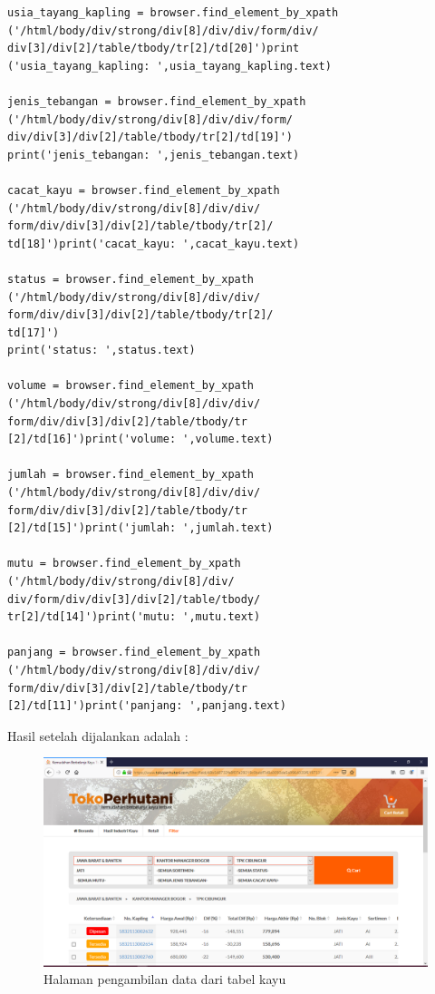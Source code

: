 \begin{verbatim}
usia_tayang_kapling = browser.find_element_by_xpath
('/html/body/div/strong/div[8]/div/div/form/div/
div[3]/div[2]/table/tbody/tr[2]/td[20]')print
('usia_tayang_kapling: ',usia_tayang_kapling.text)

jenis_tebangan = browser.find_element_by_xpath
('/html/body/div/strong/div[8]/div/div/form/
div/div[3]/div[2]/table/tbody/tr[2]/td[19]')
print('jenis_tebangan: ',jenis_tebangan.text)

cacat_kayu = browser.find_element_by_xpath
('/html/body/div/strong/div[8]/div/div/
form/div/div[3]/div[2]/table/tbody/tr[2]/
td[18]')print('cacat_kayu: ',cacat_kayu.text)

status = browser.find_element_by_xpath
('/html/body/div/strong/div[8]/div/div/
form/div/div[3]/div[2]/table/tbody/tr[2]/
td[17]')
print('status: ',status.text)

volume = browser.find_element_by_xpath
('/html/body/div/strong/div[8]/div/div/
form/div/div[3]/div[2]/table/tbody/tr
[2]/td[16]')print('volume: ',volume.text)

jumlah = browser.find_element_by_xpath
('/html/body/div/strong/div[8]/div/div/
form/div/div[3]/div[2]/table/tbody/tr
[2]/td[15]')print('jumlah: ',jumlah.text)

mutu = browser.find_element_by_xpath
('/html/body/div/strong/div[8]/div/
div/form/div/div[3]/div[2]/table/tbody/
tr[2]/td[14]')print('mutu: ',mutu.text)

panjang = browser.find_element_by_xpath
('/html/body/div/strong/div[8]/div/div/
form/div/div[3]/div[2]/table/tbody/tr
[2]/td[11]')print('panjang: ',panjang.text)
\end{verbatim}

Hasil setelah dijalankan adalah :
\begin{figure}[h]
	\centering
	\includegraphics[scale=0.25]{figures/1tabelkayu}
	\caption{Halaman pengambilan data dari tabel kayu}
\end{figure}

